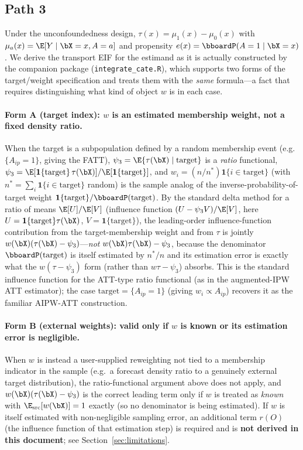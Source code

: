 \documentclass{article}
\renewcommand{\P}{\bboardP}
\begin{document}
\subsection{Path 3}
\label{sec:eif3}

Under the unconfoundedness design, $\tau(x) = \mu_1(x)-\mu_0(x)$ with $\mu_a(x)=\E[Y\mid \bX=x,A=a]$ and propensity $e(x) = \P(A=1\mid \bX=x)$. We derive the transport EIF for the estimand as it is actually constructed by the companion package (\texttt{integrate\_cate.R}), which supports two forms of the target/weight specification and treats them with the \emph{same} formula---a fact that requires distinguishing what kind of object $w$ is in each case.

\paragraph{Form A (target index): $w$ is an estimated membership weight, not a fixed density ratio.} When the target is a subpopulation defined by a random membership event (e.g.\ $\{A_{ip}=1\}$, giving the FATT), $\psi_3 = \E\{\tau(\bX)\mid \text{target}\}$ is a \emph{ratio} functional, $\psi_3 = \E[\mathbf{1}\{\text{target}\}\,\tau(\bX)]/\E[\mathbf{1}\{\text{target}\}]$, and $w_i = (n/n^*)\mathbf{1}\{i\in\text{target}\}$ (with $n^*=\sum_i\mathbf{1}\{i\in\text{target}\}$ random) is the sample analog of the inverse-probability-of-target weight $\mathbf{1}\{\text{target}\}/\P(\text{target})$. By the standard delta method for a ratio of means $\E[U]/\E[V]$ (influence function $(U-\psi_3 V)/\E[V]$, here $U=\mathbf{1}\{\text{target}\}\tau(\bX)$, $V=\mathbf{1}\{\text{target}\}$), the leading-order influence-function contribution from the target-membership weight and from $\tau$ is jointly $w(\bX)(\tau(\bX)-\psi_3)$---\emph{not} $w(\bX)\tau(\bX)-\psi_3$, because the denominator $\P(\text{target})$ is itself estimated by $n^*/n$ and its estimation error is exactly what the $w(\tau-\psi_3)$ form (rather than $w\tau-\psi_3$) absorbs. This is the standard influence function for the ATT-type ratio functional (as in the augmented-IPW ATT estimator); the case $\text{target}=\{A_{ip}=1\}$ (giving $w_i \propto A_{ip}$) recovers it as the familiar AIPW-ATT construction.

\paragraph{Form B (external weights): valid only if $w$ is known or its estimation error is negligible.} When $w$ is instead a user-supplied reweighting not tied to a membership indicator in the sample (e.g.\ a forecast density ratio to a genuinely external target distribution), the ratio-functional argument above does not apply, and $w(\bX)(\tau(\bX)-\psi_3)$ is the correct leading term only if $w$ is treated as \emph{known} with $\E_{\mathrm{src}}[w(\bX)]=1$ exactly (so no denominator is being estimated). If $w$ is itself estimated with non-negligible sampling error, an additional term $r(O)$ (the influence function of that estimation step) is required and is \textbf{not derived in this document}; see Section~\ref{sec:limitations}.
\end{document}
